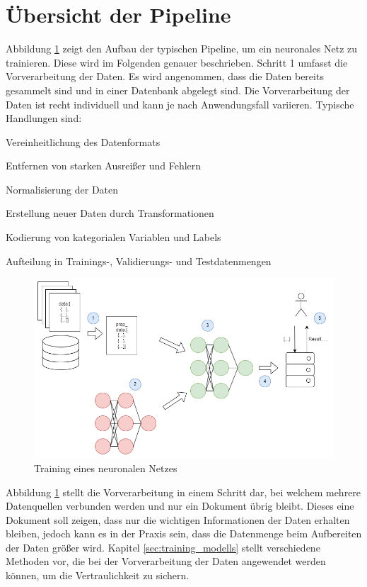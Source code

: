 \section{Übersicht der Pipeline}\label{sec:ml_pipeline}


Abbildung \ref{fig:ml_pipeline} zeigt den Aufbau der typischen Pipeline, um ein neuronales Netz zu trainieren. 
Diese wird im Folgenden genauer beschrieben.
Schritt 1 umfasst die Vorverarbeitung der Daten.
Es wird angenommen, dass die Daten bereits gesammelt sind und in einer Datenbank abgelegt sind.
Die Vorverarbeitung der Daten ist recht individuell und kann je nach Anwendungsfall variieren. 
Typische Handlungen sind:
\begin{compactitem}
\item Vereinheitlichung des Datenformats
\item Entfernen von starken Ausreißer und Fehlern
\item Normalisierung der Daten
\item Erstellung neuer Daten durch Transformationen
\item Kodierung von kategorialen Variablen und Labels
\item Aufteilung in Trainings-, Validierungs- und Testdatenmengen
\end{compactitem}
\begin{figure}[!htb]
    \centering
    \includegraphics[width=14cm]{figures/ml_pipeline.png}
    \caption{Training eines neuronalen Netzes}
    \label{fig:ml_pipeline}
\end{figure} 

Abbildung \ref{fig:ml_pipeline} stellt die Vorverarbeitung in einem Schritt dar, bei welchem mehrere Datenquellen verbunden werden und nur ein Dokument übrig bleibt. 
Dieses eine Dokument soll zeigen, dass nur die wichtigen Informationen der Daten erhalten bleiben, jedoch kann es in der Praxis sein, dass die Datenmenge beim Aufbereiten der Daten größer wird. 
Kapitel \ref{sec:training_modells} stellt verschiedene Methoden vor, die bei der Vorverarbeitung der Daten angewendet werden können, um die Vertraulichkeit zu sichern.

